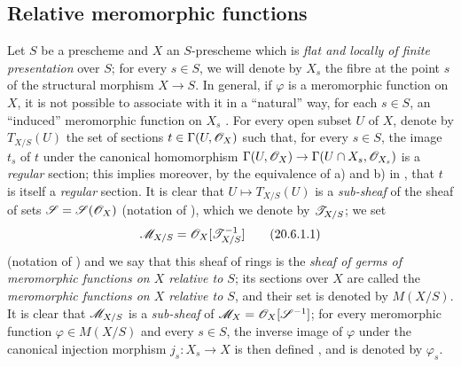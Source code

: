 
\subsection{Relative meromorphic functions}

\begin{env}[20.6.1]\label{IV.20.6.1}
Let $S$ be a prescheme and $X$ an $S$-prescheme which is \emph{flat and locally of finite presentation} over $S$; for every $s\in S$, we will denote by $X_s$ the fibre at the point $s$ of the structural morphism $X\to S$.
In general, if $\varphi$ is a meromorphic function on $X$, it is not possible to associate with it in a ``natural'' way, for each $s\in S$, an ``induced'' meromorphic function on $X_s$ .
For every open subset $U$ of $X$, denote by $T_{X/S}(U)$ the set of sections $t\in\Gamma(U,\mathscr{O}_X)$ such that, for every $s\in S$, the image $t_s$ of $t$ under the canonical homomorphism $\Gamma(U,\mathscr{O}_X)\to\Gamma(U\cap X_s,\mathscr{O}_{X_s})$ is a \emph{regular} section; this implies moreover, by the equivalence of a) and b) in , that $t$ is itself a \emph{regular} section.
It is clear that $U\mapsto T_{X/S}(U)$ is a \emph{sub-sheaf} of the sheaf of sets $\mathscr{S}=\mathscr{S}(\mathscr{O}_X)$ (notation of ), which we denote by $\mathscr{T}_{X/S}$; we set
\[
\label{IV.20.6.1.1}
  \mathscr{M}_{X/S}=\mathscr{O}_X[\mathscr{T}_{X/S}^{-1}]
  \tag{20.6.1.1}
\]
(notation of ) and we say that this sheaf of rings is the \emph{sheaf of germs of meromorphic functions on $X$ relative to $S$}; its sections over $X$ are called the \emph{meromorphic functions on $X$ relative to $S$}, and their set is denoted by $M(X/S)$.
It is clear that $\mathscr{M}_{X/S}$ is a \emph{sub-sheaf} of $\mathscr{M}_X=\mathscr{O}_X[\mathscr{S}^{-1}]$; for every meromorphic function $\varphi\in M(X/S)$ and every $s\in S$, the inverse image of $\varphi$ under the canonical injection morphism $j_s:X_s\to X$ is then defined , and is denoted by $\varphi_s$.
\end{env}

